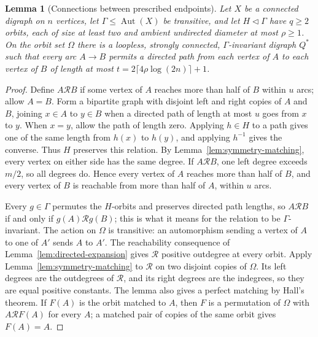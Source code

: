 \documentclass[11pt,a4paper,reqno]{amsart}
\newtheorem{lemma}[theorem]{Lemma}
\theoremstyle{definition}
\theoremstyle{remark}
\numberwithin{equation}{section}
\DeclareMathOperator{\Aut}{Aut}
\begin{document}
\begin{lemma}[Connections between prescribed endpoints]\label{lem:short-directed-connections}
Let $X$ be a connected digraph on $n$ vertices, let $\Gamma\le\Aut(X)$ be transitive, and let $H\lhd\Gamma$ have $q\ge2$ orbits, each of size at least two and ambient undirected diameter at most $\rho\ge1$. On the orbit set $\Omega$ there is a loopless, strongly connected, $\Gamma$-invariant digraph $Q^*$ such that every arc $A\to B$ permits a directed path from each vertex of $A$ to each vertex of $B$ of length at most $t=2\lceil4\rho\log(2n)\rceil+1$.
\end{lemma}
\begin{proof}
Define $A\mathcal R B$ if some vertex of $A$ reaches more than half of $B$ within $u$ arcs; allow $A=B$. Form a bipartite graph with disjoint left and right copies of $A$ and $B$, joining $x\in A$ to $y\in B$ when a directed path of length at most $u$ goes from $x$ to $y$. When $x=y$, allow the path of length zero. Applying $h\in H$ to a path gives one of the same length from $h(x)$ to $h(y)$, and applying $h^{-1}$ gives the converse. Thus $H$ preserves this relation. By Lemma~\ref{lem:symmetry-matching}, every vertex on either side has the same degree. If $A\mathcal R B$, one left degree exceeds $m/2$, so all degrees do. Hence every vertex of $A$ reaches more than half of $B$, and every vertex of $B$ is reachable from more than half of $A$, within $u$ arcs.

Every $g\in\Gamma$ permutes the $H$-orbits and preserves directed path lengths, so $A\mathcal R B$ if and only if $g(A)\mathcal R g(B)$; this is what it means for the relation to be $\Gamma$-invariant. The action on $\Omega$ is transitive: an automorphism sending a vertex of $A$ to one of $A'$ sends $A$ to $A'$. The reachability consequence of Lemma~\ref{lem:directed-expansion} gives $\mathcal R$ positive outdegree at every orbit. Apply Lemma~\ref{lem:symmetry-matching} to $\mathcal R$ on two disjoint copies of $\Omega$. Its left degrees are the outdegrees of $\mathcal R$, and its right degrees are the indegrees, so they are equal positive constants. The lemma also gives a perfect matching by Hall's theorem. If $F(A)$ is the orbit matched to $A$, then $F$ is a permutation of $\Omega$ with $A\mathcal R F(A)$ for every $A$; a matched pair of copies of the same orbit gives $F(A)=A$.


\end{proof}
\end{document}
